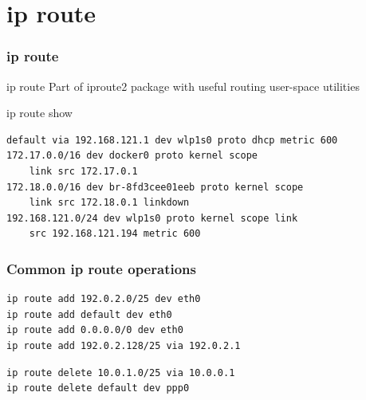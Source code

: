 \documentclass{beamer}
\begin{document}
\section{ip route}
\begin{frame}[fragile]
\frametitle{ip route}
\begin{block}{ip route}
Part of iproute2 package with useful routing user-space utilities
\end{block}
\begin{example}
ip route show
\end{example}
\begin{example}[Output]
\begin{verbatim}default via 192.168.121.1 dev wlp1s0 proto dhcp metric 600
172.17.0.0/16 dev docker0 proto kernel scope
    link src 172.17.0.1
172.18.0.0/16 dev br-8fd3cee01eeb proto kernel scope
    link src 172.18.0.1 linkdown
192.168.121.0/24 dev wlp1s0 proto kernel scope link
    src 192.168.121.194 metric 600\end{verbatim}
\end{example}
\end{frame}

\begin{frame}[fragile]
\frametitle{Common ip route operations}
\begin{example}
\begin{verbatim}
ip route add 192.0.2.0/25 dev eth0
ip route add default dev eth0
ip route add 0.0.0.0/0 dev eth0
ip route add 192.0.2.128/25 via 192.0.2.1
\end{verbatim}
\end{example}

\begin{example}
\begin{verbatim}
ip route delete 10.0.1.0/25 via 10.0.0.1
ip route delete default dev ppp0
\end{verbatim}
\end{example}

\end{frame}
\end{document}
